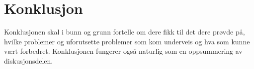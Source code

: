 \section{Konklusjon}

Konklusjonen skal i bunn og grunn fortelle om dere fikk til det dere prøvde på, hvilke problemer og uforutsette problemer som kom underveis og hva som kunne vært forbedret. 
Konklusjonen fungerer også naturlig som en oppsummering av diskusjonsdelen.